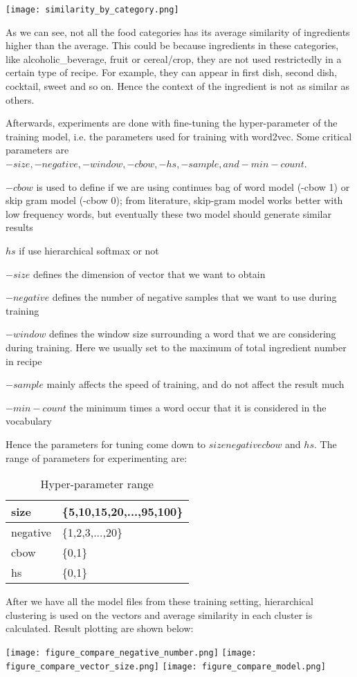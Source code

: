 \documentclass[12pt]{article}
\begin{document}
\begin{center}
\texttt{[image: similarity\_by\_category.png]}
\end{center}

As we can see, not all the food categories has its average similarity of ingredients higher than the average. This could be because ingredients in these categories, like alcoholic\_beverage, fruit or cereal/crop, they are not used restrictedly in a certain type of recipe. For example, they can appear in first dish, second dish, cocktail, sweet and so on. Hence the context of the ingredient is not as similar as others.

Afterwards, experiments are done with fine-tuning the hyper-parameter of the training model, i.e. the parameters used for training with word2vec. Some critical parameters are $-size, -negative, -window, -cbow, -hs, -sample, and -min-count$.

$-cbow$ is used to define if we are using continues bag of word model (-cbow 1) or skip gram model (-cbow 0); from literature, skip-gram model works better with low frequency words, but eventually these two model should generate similar results

$hs$ if use hierarchical softmax or not

$-size$ defines the dimension of vector that we want to obtain

$-negative$ defines the number of negative samples that we want to use during training

$-window$ defines the window size surrounding a word that we are considering during training. Here we usually set to the maximum of total ingredient number in recipe 

$-sample$ mainly affects the speed of training, and do not affect the result much

$-min-count$ the minimum times a word occur that it is considered in the vocabulary

Hence the parameters for tuning come down to $size negative cbow$ and $hs$. The range of parameters for experimenting are:

\begin{table}[h]
\centering
\caption{Hyper-parameter range}
\label{my-label}
\begin{tabular}{|l|l|}
\hline
size     & \{5,10,15,20,...,95,100\}   \\ \hline
negative & \{1,2,3,...,20\}           \\ \hline
cbow     & \{0,1\}        \\ \hline
hs       & \{0,1\}     \\ \hline
\end{tabular}
\end{table}

After we have all the model files from these training setting, hierarchical clustering is used on the vectors and average similarity in each cluster is calculated. Result plotting are shown below:

\begin{center}
\texttt{[image: figure\_compare\_negative\_number.png]}
\texttt{[image: figure\_compare\_vector\_size.png]}
\texttt{[image: figure\_compare\_model.png]}
\end{center}
\end{document}
